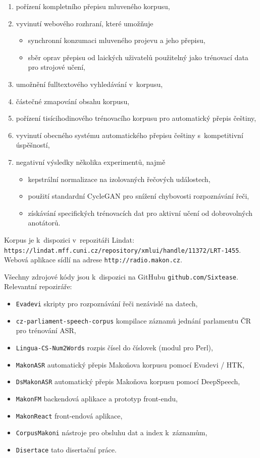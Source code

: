 \begin{enumerate}
\item{pořízení kompletního přepisu mluveného korpusu,}
\item{vyvinutí webového rozhraní, které umožňuje
    \begin{itemize}
    \item{synchronní konzumaci mluveného projevu a jeho přepisu,}
    \item{
        sběr oprav přepisu od laických uživatelů použitelný jako trénovací data
        pro strojové učení,
    }
    \end{itemize}
}
\item{umožnění fulltextového vyhledávání v~korpusu,}
\item{částečné zmapování obsahu korpusu,}
\item{
    pořízení tisícihodinového trénovacího korpusu pro automatický přepis
    češtiny,
}
\item{
    vyvinutí obecného systému automatického přepisu češtiny s~kompetitivní
    úspěšností,
}
\item{
    negativní výsledky několika experimentů, najmě
    \begin{itemize}
    \item{kepstrální normalizace na izolovaných řečových událostech,}
    \item{použití standardní CycleGAN pro snížení chybovosti rozpoznávání řeči,}
    \item{
        získávání specifických trénovacích dat pro aktivní učení od
        dobrovolných anotátorů.
    }
    \end{itemize}
}
\end{enumerate}

Korpus je k~dispozici v~repozitáři Lindat:\\
\texttt{https://lindat.mff.cuni.cz/repository/xmlui/handle/11372/LRT-1455}.\\
Webová aplikace sídlí na adrese \texttt{http://radio.makon.cz}.

Všechny zdrojové kódy jsou k~dispozici na GitHubu \texttt{github.com/Sixtease}.
Relevantní repoziráře:
\begin{itemize}
\item{\texttt{Evadevi} skripty pro rozpoznávání řeči nezávislé na datech,}
\item{\texttt{cz-parliament-speech-corpus}
    kompilace záznamů jednání parlamentu ČR pro trénování ASR,
}
\item{\texttt{Lingua-CS-Num2Words} rozpis čísel do číslovek (modul pro Perl),}
\item{\texttt{MakonASR} automatický přepis Makoňova korpusu pomocí Evadevi / HTK,}
\item{\texttt{DsMakonASR} automatický přepis Makoňova korpusu pomocí DeepSpeech,}
\item{\texttt{MakonFM} backendová aplikace a prototyp front-endu,}
\item{\texttt{MakonReact} front-endová aplikace,}
\item{\texttt{CorpusMakoni} nástroje pro obsluhu dat a index k~záznamům,}
\item{\texttt{Disertace} tato disertační práce.}
\end{itemize}

